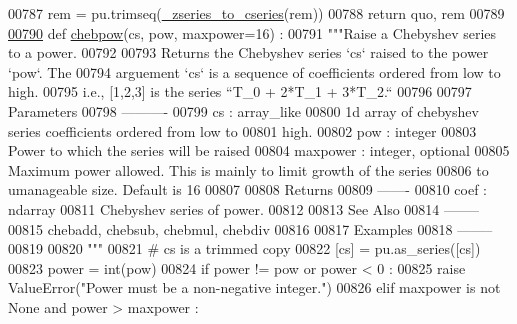 \begin{DoxyCode}
00787         rem = pu.trimseq(\hyperlink{namespacepyneb_1_1utils_1_1chebyshev_a2a88474ce0ea12fb26f82b7116752dc1}{\_zseries\_to\_cseries}(rem))
00788         \textcolor{keywordflow}{return} quo, rem
00789 
\hypertarget{chebyshev_8py_source_l00790}{}\hyperlink{namespacepyneb_1_1utils_1_1chebyshev_ab647ff3aa7750a09b934b98cddd4c90d}{00790} \textcolor{keyword}{def }\hyperlink{namespacepyneb_1_1utils_1_1chebyshev_ab647ff3aa7750a09b934b98cddd4c90d}{chebpow}(cs, pow, maxpower=16) :
00791     \textcolor{stringliteral}{"""Raise a Chebyshev series to a power.}
00792 \textcolor{stringliteral}{}
00793 \textcolor{stringliteral}{    Returns the Chebyshev series `cs` raised to the power `pow`. The}
00794 \textcolor{stringliteral}{    arguement `cs` is a sequence of coefficients ordered from low to high.}
00795 \textcolor{stringliteral}{    i.e., [1,2,3] is the series  ``T\_0 + 2*T\_1 + 3*T\_2.``}
00796 \textcolor{stringliteral}{}
00797 \textcolor{stringliteral}{    Parameters}
00798 \textcolor{stringliteral}{    ----------}
00799 \textcolor{stringliteral}{    cs : array\_like}
00800 \textcolor{stringliteral}{        1d array of chebyshev series coefficients ordered from low to}
00801 \textcolor{stringliteral}{        high.}
00802 \textcolor{stringliteral}{    pow : integer}
00803 \textcolor{stringliteral}{        Power to which the series will be raised}
00804 \textcolor{stringliteral}{    maxpower : integer, optional}
00805 \textcolor{stringliteral}{        Maximum power allowed. This is mainly to limit growth of the series}
00806 \textcolor{stringliteral}{        to umanageable size. Default is 16}
00807 \textcolor{stringliteral}{}
00808 \textcolor{stringliteral}{    Returns}
00809 \textcolor{stringliteral}{    -------}
00810 \textcolor{stringliteral}{    coef : ndarray}
00811 \textcolor{stringliteral}{        Chebyshev series of power.}
00812 \textcolor{stringliteral}{}
00813 \textcolor{stringliteral}{    See Also}
00814 \textcolor{stringliteral}{    --------}
00815 \textcolor{stringliteral}{    chebadd, chebsub, chebmul, chebdiv}
00816 \textcolor{stringliteral}{}
00817 \textcolor{stringliteral}{    Examples}
00818 \textcolor{stringliteral}{    --------}
00819 \textcolor{stringliteral}{}
00820 \textcolor{stringliteral}{    """}
00821     \textcolor{comment}{# cs is a trimmed copy}
00822     [cs] = pu.as\_series([cs])
00823     power = int(pow)
00824     \textcolor{keywordflow}{if} power != pow \textcolor{keywordflow}{or} power < 0 :
00825         \textcolor{keywordflow}{raise} ValueError(\textcolor{stringliteral}{"Power must be a non-negative integer."})
00826     \textcolor{keywordflow}{elif} maxpower \textcolor{keywordflow}{is} \textcolor{keywordflow}{not} \textcolor{keywordtype}{None} \textcolor{keywordflow}{and} power > maxpower :

\end{DoxyCode}

